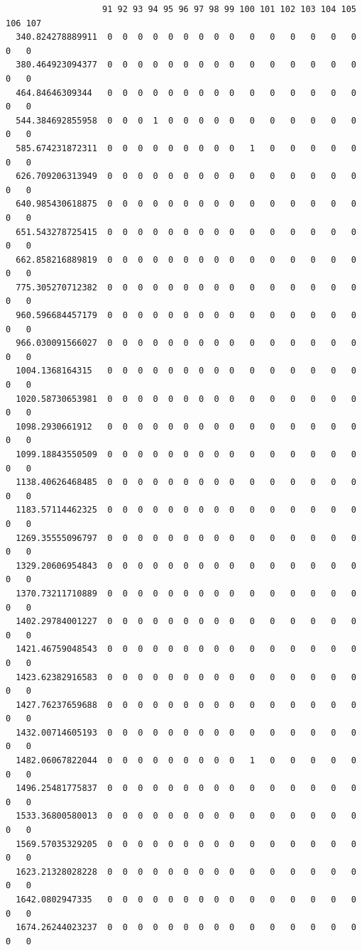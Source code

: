\documentclass[
  letterpaper,
  DIV=11,
  numbers=noendperiod]{scrartcl}
\begin{document}
\begin{verbatim}
                   91 92 93 94 95 96 97 98 99 100 101 102 103 104 105 106 107
  340.824278889911  0  0  0  0  0  0  0  0  0   0   0   0   0   0   0   0   0
  380.464923094377  0  0  0  0  0  0  0  0  0   0   0   0   0   0   0   0   0
  464.84646309344   0  0  0  0  0  0  0  0  0   0   0   0   0   0   0   0   0
  544.384692855958  0  0  0  1  0  0  0  0  0   0   0   0   0   0   0   0   0
  585.674231872311  0  0  0  0  0  0  0  0  0   1   0   0   0   0   0   0   0
  626.709206313949  0  0  0  0  0  0  0  0  0   0   0   0   0   0   0   0   0
  640.985430618875  0  0  0  0  0  0  0  0  0   0   0   0   0   0   0   0   0
  651.543278725415  0  0  0  0  0  0  0  0  0   0   0   0   0   0   0   0   0
  662.858216889819  0  0  0  0  0  0  0  0  0   0   0   0   0   0   0   0   0
  775.305270712382  0  0  0  0  0  0  0  0  0   0   0   0   0   0   0   0   0
  960.596684457179  0  0  0  0  0  0  0  0  0   0   0   0   0   0   0   0   0
  966.030091566027  0  0  0  0  0  0  0  0  0   0   0   0   0   0   0   0   0
  1004.1368164315   0  0  0  0  0  0  0  0  0   0   0   0   0   0   0   0   0
  1020.58730653981  0  0  0  0  0  0  0  0  0   0   0   0   0   0   0   0   0
  1098.2930661912   0  0  0  0  0  0  0  0  0   0   0   0   0   0   0   0   0
  1099.18843550509  0  0  0  0  0  0  0  0  0   0   0   0   0   0   0   0   0
  1138.40626468485  0  0  0  0  0  0  0  0  0   0   0   0   0   0   0   0   0
  1183.57114462325  0  0  0  0  0  0  0  0  0   0   0   0   0   0   0   0   0
  1269.35555096797  0  0  0  0  0  0  0  0  0   0   0   0   0   0   0   0   0
  1329.20606954843  0  0  0  0  0  0  0  0  0   0   0   0   0   0   0   0   0
  1370.73211710889  0  0  0  0  0  0  0  0  0   0   0   0   0   0   0   0   0
  1402.29784001227  0  0  0  0  0  0  0  0  0   0   0   0   0   0   0   0   0
  1421.46759048543  0  0  0  0  0  0  0  0  0   0   0   0   0   0   0   0   0
  1423.62382916583  0  0  0  0  0  0  0  0  0   0   0   0   0   0   0   0   0
  1427.76237659688  0  0  0  0  0  0  0  0  0   0   0   0   0   0   0   0   0
  1432.00714605193  0  0  0  0  0  0  0  0  0   0   0   0   0   0   0   0   0
  1482.06067822044  0  0  0  0  0  0  0  0  0   1   0   0   0   0   0   0   0
  1496.25481775837  0  0  0  0  0  0  0  0  0   0   0   0   0   0   0   0   0
  1533.36800580013  0  0  0  0  0  0  0  0  0   0   0   0   0   0   0   0   0
  1569.57035329205  0  0  0  0  0  0  0  0  0   0   0   0   0   0   0   0   0
  1623.21328028228  0  0  0  0  0  0  0  0  0   0   0   0   0   0   0   0   0
  1642.0802947335   0  0  0  0  0  0  0  0  0   0   0   0   0   0   0   0   0
  1674.26244023237  0  0  0  0  0  0  0  0  0   0   0   0   0   0   0   0   0

\end{verbatim}
\end{document}
